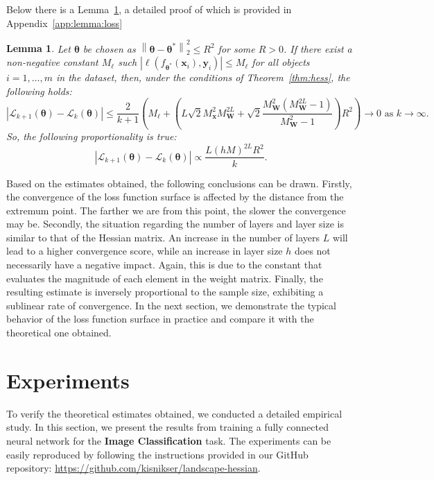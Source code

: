 \documentclass{article}
\newtheorem{lemma}{Lemma}%
\begin{document}
Below there is a Lemma~\ref{lemma:loss}, a detailed proof of which is provided in Appendix~\ref{app:lemma:loss}

\begin{lemma}\label{lemma:loss}
    Let $\boldsymbol{\theta}$ be chosen as $\left\|\boldsymbol{\theta} - \boldsymbol{\theta}^*\right\|_2^2 \leqslant R^2$ for some $R > 0$. If there exist a non-negative constant $M_{\ell}$ such $\left| \ell(f_{\boldsymbol{\theta}^*}(\mathbf{x}_{i}), \mathbf{y}_{i}) \right| \leqslant M_{\ell}$ for all objects $i = 1, \ldots, m$ in the dataset, then, under the conditions of Theorem~\ref{thm:hess}, the following holds:
    \[ \left| \mathcal{L}_{k+1}(\boldsymbol{\theta}) - \mathcal{L}_k(\boldsymbol{\theta}) \right| \leqslant \dfrac{2}{k+1}\left( M_{\ell} + \left( L \sqrt{2} M_{\mathbf{x}}^2 M_{\mathbf{W}}^{2L} + \sqrt{2} \dfrac{M_{\mathbf{W}}^2 (M_{\mathbf{W}}^{2L} - 1)}{M_{\mathbf{W}}^2 - 1} \right) R^2 \right) \to 0 \text{ as } k \to \infty. \]
    So, the following proportionality is true:
    \begin{equation}\label{eq:rate}
        \left| \mathcal{L}_{k+1}(\boldsymbol{\theta}) - \mathcal{L}_k(\boldsymbol{\theta}) \right| \propto \dfrac{L (hM)^{2L} R^2}{k}. 
    \end{equation}
\end{lemma}

Based on the estimates obtained, the following conclusions can be drawn. Firstly, the convergence of the loss function surface is affected by the distance from the extremum point. The farther we are from this point, the slower the convergence may be. Secondly, the situation regarding the number of layers and layer size is similar to that of the Hessian matrix. An increase in the number of layers $L$ will lead to a higher convergence score, while an increase in layer size $h$ does not necessarily have a negative impact. Again, this is due to the constant that evaluates the magnitude of each element in the weight matrix. Finally, the resulting estimate is inversely proportional to the sample size, exhibiting a sublinear rate of convergence. In the next section, we demonstrate the typical behavior of the loss function surface in practice and compare it with the theoretical one obtained.

\section{Experiments}\label{sec:exp}

To verify the theoretical estimates obtained, we conducted a detailed empirical study. In this section, we present the results from training a fully connected neural network for the \textbf{Image Classification} task. The experiments can be easily reproduced by following the instructions provided in our GitHub repository: \href{https://github.com/kisnikser/landscape-hessian}{https://github.com/kisnikser/landscape-hessian}.
\end{document}
